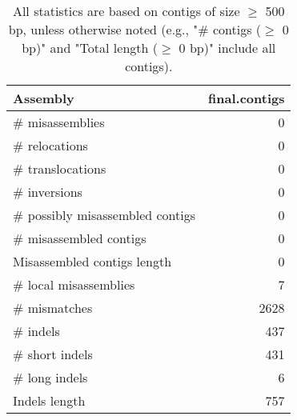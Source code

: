 \documentclass[12pt,a4paper]{article}
\begin{document}
\begin{table}[ht]
\begin{center}
\caption{All statistics are based on contigs of size $\geq$ 500 bp, unless otherwise noted (e.g., "\# contigs ($\geq$ 0 bp)" and "Total length ($\geq$ 0 bp)" include all contigs).}
\begin{tabular}{|l*{1}{|r}|}
\hline
Assembly & final.contigs \\ \hline
\# misassemblies & 0 \\ \hline
\hspace{5mm}\# relocations & 0 \\ \hline
\hspace{5mm}\# translocations & 0 \\ \hline
\hspace{5mm}\# inversions & 0 \\ \hline
\# possibly misassembled contigs & 0 \\ \hline
\# misassembled contigs & 0 \\ \hline
Misassembled contigs length & 0 \\ \hline
\# local misassemblies & 7 \\ \hline
\# mismatches & 2628 \\ \hline
\# indels & 437 \\ \hline
\hspace{5mm}\# short indels & 431 \\ \hline
\hspace{5mm}\# long indels & 6 \\ \hline
Indels length & 757 \\ \hline
\end{tabular}
\end{center}
\end{table}
\end{document}
